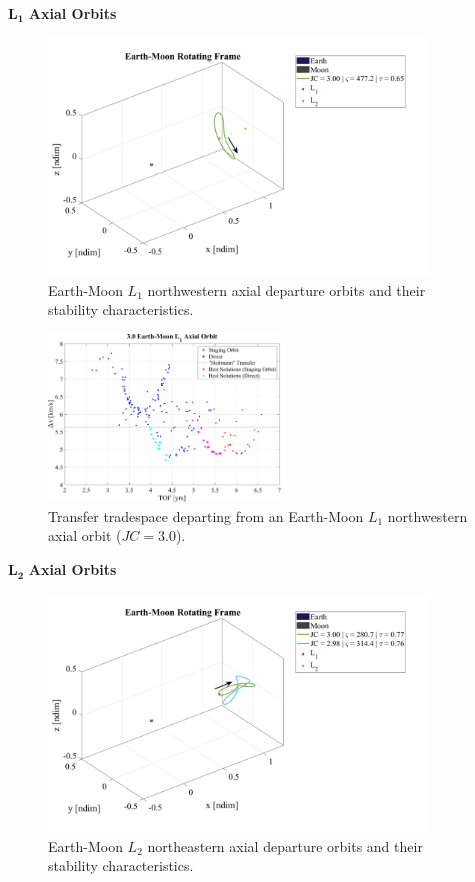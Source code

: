 $\pmb{L_{1}}$ \textbf{Axial Orbits}
\begin{figure}[ht]
    \centering
    \includegraphics[width=0.9\textwidth]{figures/L1AxialDepartureOrbits.pdf}
    \caption{Earth-Moon $L_{1}$ northwestern axial departure orbits and their stability characteristics.}
\end{figure}
\clearpage

\begin{figure}[ht]
    \centering
    \includegraphics[width=0.55\textwidth]{figures/TradeSpace_L1Axial_3_00.pdf}
    \caption{Transfer tradespace departing from an Earth-Moon $L_{1}$ northwestern axial orbit ($JC=3.0$).}
\end{figure}
\clearpage

$\pmb{L_{2}}$ \textbf{Axial Orbits}
\begin{figure}[ht]
    \centering
    \includegraphics[width=0.9\textwidth]{figures/L2AxialDepartureOrbits.pdf}
    \caption{Earth-Moon $L_{2}$ northeastern axial departure orbits and their stability characteristics.}
\end{figure}
\clearpage

